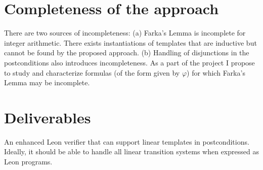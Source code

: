 \documentclass[a4paper,10pt]{article}
\begin{document}
\section{Completeness of the approach}

There are two sources of incompleteness: (a) Farka's Lemma is incomplete for integer arithmetic. There exists instantiations of templates that are inductive but cannot be found by the proposed approach. (b) Handling of disjunctions in the postconditions also introduces incompleteness.
As a part of the project I propose to study and characterize formulas (of the form given by $\varphi$) for which Farka's Lemma may be incomplete.

\section{Deliverables}

An enhanced Leon verifier that can support linear templates in postconditions. Ideally, it should be able to handle all linear transition systems when expressed as Leon programs.



\end{document}
